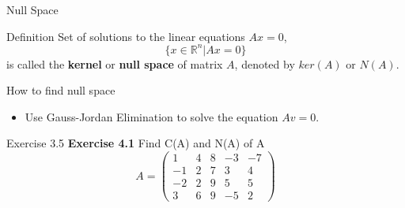 \documentclass{beamer}
\begin{document}
\begin{frame}{Null Space}
    \begin{block}{Definition}
        Set of solutions to the linear equations $Ax=0$,
        \begin{equation*}
            \{x\in\mathbb{R}^n|Ax=0\} 
        \end{equation*}
        is called the \textbf{kernel} or \textbf{null space} of matrix $A$, denoted by $ker(A)$ or $N(A)$.
    \end{block}
    \begin{block}{How to find null space}
        \begin{itemize}
            \item Use Gauss-Jordan Elimination to solve the equation $Av=0$.
        \end{itemize}
    \end{block}
\end{frame}
\begin{frame}{Exercise 3.5}
    \textbf{Exercise 4.1} Find C(A) and N(A) of A
    \begin{equation*}
        A=\begin{pmatrix}
            1&4&8&-3&-7\\
            -1&2&7&3&4\\
            -2&2&9&5&5\\
            3&6&9&-5&2
        \end{pmatrix}
    \end{equation*}
\end{frame}
\end{document}
